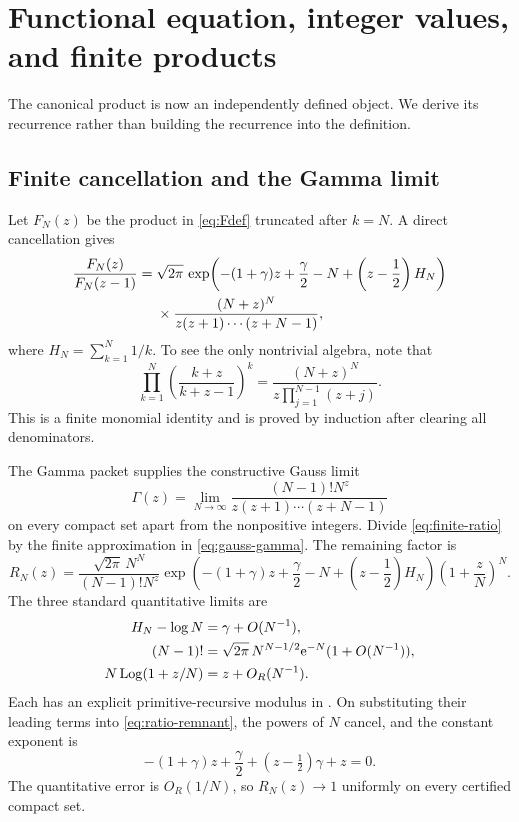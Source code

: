 \section{Functional equation, integer values, and finite products}\label{sec:functional}

The canonical product is now an independently defined object.  We derive its
recurrence rather than building the recurrence into the definition.

\subsection{Finite cancellation and the Gamma limit}

Let \(F_N(z)\) be the product in \cref{eq:Fdef} truncated after \(k=N\).
A direct cancellation gives
\begin{align}
 \frac{F_N(z)}{F_N(z-1)}
 ={}&\sqrt{2\pi}\,
 \exp\!\left(-(1+\gamma)z+\frac\gamma2-N+
                 \left(z-\frac12\right)H_N\right)\notag\\
 &\times
 \frac{(N+z)^N}{z(z+1)\cdots(z+N-1)},
 \label{eq:finite-ratio}
\end{align}
where \(H_N=\sum_{k=1}^N1/k\).  To see the only nontrivial algebra, note that
\[
 \prod_{k=1}^{N}
 \left(\frac{k+z}{k+z-1}\right)^k
 =\frac{(N+z)^N}{z\prod_{j=1}^{N-1}(z+j)}.
\]
This is a finite monomial identity and is proved by induction after clearing all
denominators.

The Gamma packet supplies the constructive Gauss limit
\begin{equation}\label{eq:gauss-gamma}
 \Gamma(z)=\lim_{N\to\infty}
 \frac{(N-1)!N^z}{z(z+1)\cdots(z+N-1)}
\end{equation}
on every compact set apart from the nonpositive integers.  Divide
\cref{eq:finite-ratio} by the finite approximation in
\cref{eq:gauss-gamma}.  The remaining factor is
\begin{equation}\label{eq:ratio-remnant}
 R_N(z)=
 \frac{\sqrt{2\pi}\,N^N}{(N-1)!N^z}
 \exp\!\left(-(1+\gamma)z+\frac\gamma2-N+
       \left(z-\frac12\right)H_N\right)
 \left(1+\frac zN\right)^N.
\end{equation}
The three standard quantitative limits are
\begin{align}
 H_N-\log N&=\gamma+O(N^{-1}),\label{eq:harmonic-limit}\\
 (N-1)!&=\sqrt{2\pi}\,N^{N-1/2}\mathrm e^{-N}(1+O(N^{-1})),
 \label{eq:stirling-fac}\\
 N\operatorname{Log}(1+z/N)&=z+O_R(N^{-1}).\label{eq:exp-limit}
\end{align}
Each has an explicit primitive-recursive modulus in .  On
substituting their leading terms into \cref{eq:ratio-remnant}, the powers of
\(N\) cancel, and the constant exponent is
\[
 -(1+\gamma)z+\frac\gamma2
 +(z-\tfrac12)\gamma+z=0.
\]
The quantitative error is \(O_R(1/N)\), so \(R_N(z)\to1\) uniformly on every
certified compact set.

